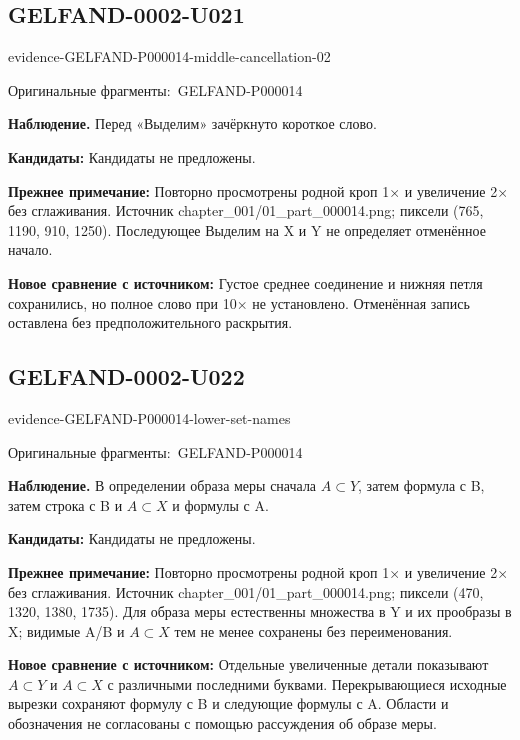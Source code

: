 \documentclass[11pt]{article}
\newcommand{\EvidenceBlock}[4]{%
 \par\smallskip\noindent\begin{minipage}{\linewidth}
 \begin{minipage}[t]{.47\linewidth}\vspace{0pt}\centering
 \csname evidence-#1-#2\endcsname\par
 {\scriptsize\SourceCropCaption\ #1}\par
 \end{minipage}\hfill
 \begin{minipage}[t]{.49\linewidth}\vspace{0pt}\raggedright
 {\small\color{orange!65!black}\textbf{#4} #3}\par
 \end{minipage}
 \end{minipage}\par\smallskip}
\newcommand{\SourceCropCaption}{Оригинальные фрагменты:}\newcommand{\ReadingCaption}{Сомнительное чтение.}\newcommand{\IncompleteCaption}{Неразобранный фрагмент.}\newcommand{\DiagramCaption}{Рисунок и набранное описание.}
\begin{document}
\subsection*{GELFAND-0002-U021}
\EvidenceBlock{GELFAND-P000014}{middle-cancellation-02}{Перед «Выделим» зачёркнуто короткое слово.}{Наблюдение.}
\par\smallskip\noindent\textbf{Кандидаты: } Кандидаты не предложены.\par
\par\smallskip\noindent\textbf{Прежнее примечание: } Повторно просмотрены родной кроп 1× и увеличение 2× без сглаживания. Источник chapter\_001/01\_part\_000014.png; пиксели (765, 1190, 910, 1250). Последующее Выделим на X и Y не определяет отменённое начало.\par
\par\smallskip\noindent\textbf{Новое сравнение с источником: } Густое среднее соединение и нижняя петля сохранились, но полное слово при 10× не установлено. Отменённая запись оставлена без предположительного раскрытия.\par

\subsection*{GELFAND-0002-U022}
\EvidenceBlock{GELFAND-P000014}{lower-set-names}{В определении образа меры сначала \(A\subset Y\), затем формула с B, затем строка с B и \(A\subset X\) и формулы с A.}{Наблюдение.}
\par\smallskip\noindent\textbf{Кандидаты: } Кандидаты не предложены.\par
\par\smallskip\noindent\textbf{Прежнее примечание: } Повторно просмотрены родной кроп 1× и увеличение 2× без сглаживания. Источник chapter\_001/01\_part\_000014.png; пиксели (470, 1320, 1380, 1735). Для образа меры естественны множества в Y и их прообразы в X; видимые A/B и \(A\subset X\) тем не менее сохранены без переименования.\par
\par\smallskip\noindent\textbf{Новое сравнение с источником: } Отдельные увеличенные детали показывают \(A\subset Y\) и \(A\subset X\) с различными последними буквами. Перекрывающиеся исходные вырезки сохраняют формулу с B и следующие формулы с A. Области и обозначения не согласованы с помощью рассуждения об образе меры.\par
\end{document}
